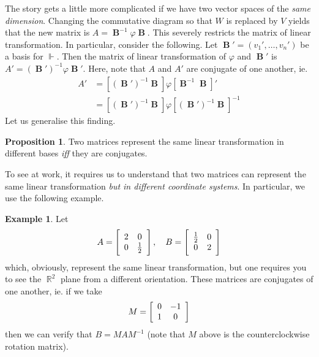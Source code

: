\documentclass[11pt]{amsart} %
\theoremstyle{definition}
\newtheorem{proposition}[definition]{Proposition}
\newtheorem{example}[definition]{Example}
\theoremstyle{definition}
\DeclareMathOperator{\R}{\mathbb{R}}
\DeclareMathOperator{\rank}{rank}
\DeclareMathOperator{\hv}{\mathbf{B}}
\numberwithin{equation}{section}
\begin{document}
The story gets a little more complicated if we have two vector spaces of the \textit{same dimension}. Changing the commutative diagram so that $W$ is replaced by $V$ yields that the new matrix is $A = \hv^{-1} \varphi \hv $. This severely restricts the matrix of linear transformation. In particular, consider the following. Let $\hv ' = (v_1' , \dots, v_n')$ be a basis for $\Vdash$. Then the matrix of linear transformation of $\varphi$ and $\hv'$ is $A' = (\hv')^{-1} \varphi \hv'$. Here, note that $A$ and $A'$ are conjugate of one another, ie.
\begin{align*}
A'&=  [(\hv')^{-1} \hv] \varphi [\hv^{-1} \hv]' \\
&= [(\hv')^{-1} \hv] \varphi [(\hv')^{-1} \hv]^{-1}
\end{align*}
Let us generalise this finding.

\begin{proposition}
	\label{sameltunderconjugation}
	Two matrices represent the same linear transformation in different bases \textit{iff} they are conjugates.
\end{proposition}


To see  at work, it requires us to understand that two matrices can represent the same linear transformation \textit{but in different coordinate systems}. In particular, we use the following example.

\begin{example}
	Let
	$$ A = \left[\begin{array}{ c c} 2 & 0 \\ 0 & \frac{1}{2} \end{array}\right], \quad B = \left[\begin{array}{ c c}  \frac{1}{2} & 0 \\ 0 & 2 \end{array}\right] $$
	which, obviously, represent the same linear transformation, but one requires you to see the $\R^2$ plane from a different orientation. These matrices are conjugates of one another, ie. if we take
	$$ M = \left[\begin{array}{ c c}  0 & -1 \\ 1 & 0 \end{array}\right]  $$
	then we can verify that $B = MAM^{-1}$ (note that $M$ above is the counterclockwise rotation matrix).
\end{example}
\end{document}
